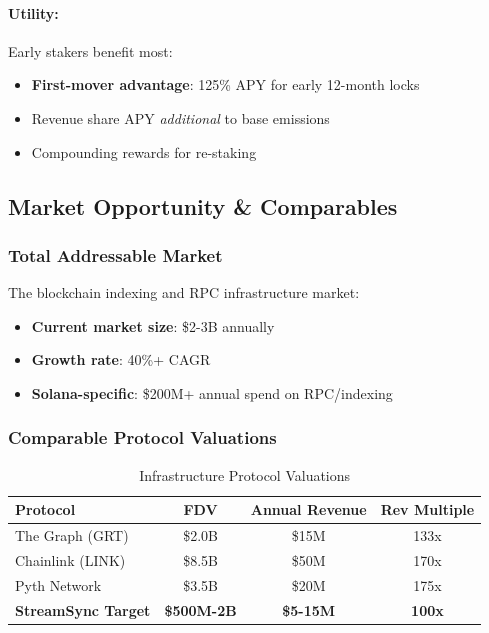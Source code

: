\documentclass[12pt,a4paper]{article}
\begin{document}
\paragraph{Utility:} Early stakers benefit most:
\begin{itemize}
    \item \textbf{First-mover advantage}: 125\% APY for early 12-month locks
    \item Revenue share APY \textit{additional} to base emissions
    \item Compounding rewards for re-staking
\end{itemize}

\subsection{Market Opportunity \& Comparables}

\subsubsection{Total Addressable Market}

The blockchain indexing and RPC infrastructure market:
\begin{itemize}
    \item \textbf{Current market size}: \$2-3B annually
    \item \textbf{Growth rate}: 40\%+ CAGR
    \item \textbf{Solana-specific}: \$200M+ annual spend on RPC/indexing
\end{itemize}

\subsubsection{Comparable Protocol Valuations}

\begin{table}[h]
\centering
\begin{tabular}{lccc}
\toprule
\textbf{Protocol} & \textbf{FDV} & \textbf{Annual Revenue} & \textbf{Rev Multiple} \\
\midrule
The Graph (GRT) & \$2.0B & \$15M & 133x \\
Chainlink (LINK) & \$8.5B & \$50M & 170x \\
Pyth Network & \$3.5B & \$20M & 175x \\
\midrule
\textbf{StreamSync Target} & \textbf{\$500M-2B} & \textbf{\$5-15M} & \textbf{100x} \\
\bottomrule
\end{tabular}
\caption{Infrastructure Protocol Valuations}
\end{table}
\end{document}
